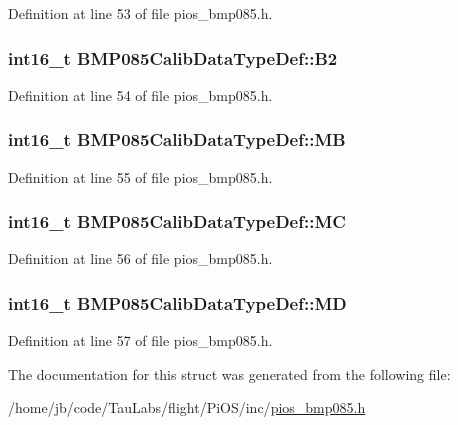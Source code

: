 \-Definition at line 53 of file pios\-\_\-bmp085.\-h.

\hypertarget{struct_b_m_p085_calib_data_type_def_a895d74abbbe7071148feed73f8217a20}{
\subsubsection[{\-B2}]{\setlength{\rightskip}{0pt plus 5cm}int16\-\_\-t {\bf \-B\-M\-P085\-Calib\-Data\-Type\-Def\-::\-B2}}}\label{struct_b_m_p085_calib_data_type_def_a895d74abbbe7071148feed73f8217a20}


\-Definition at line 54 of file pios\-\_\-bmp085.\-h.

\hypertarget{struct_b_m_p085_calib_data_type_def_a3e2e7b4e98edcfceeb7af2c622db30e9}{
\subsubsection[{\-M\-B}]{\setlength{\rightskip}{0pt plus 5cm}int16\-\_\-t {\bf \-B\-M\-P085\-Calib\-Data\-Type\-Def\-::\-M\-B}}}\label{struct_b_m_p085_calib_data_type_def_a3e2e7b4e98edcfceeb7af2c622db30e9}


\-Definition at line 55 of file pios\-\_\-bmp085.\-h.

\hypertarget{struct_b_m_p085_calib_data_type_def_a1665d1134225ff27705293714f8301f6}{
\subsubsection[{\-M\-C}]{\setlength{\rightskip}{0pt plus 5cm}int16\-\_\-t {\bf \-B\-M\-P085\-Calib\-Data\-Type\-Def\-::\-M\-C}}}\label{struct_b_m_p085_calib_data_type_def_a1665d1134225ff27705293714f8301f6}


\-Definition at line 56 of file pios\-\_\-bmp085.\-h.

\hypertarget{struct_b_m_p085_calib_data_type_def_a8bc67ebe1ea785684147c375ccc9b1be}{
\subsubsection[{\-M\-D}]{\setlength{\rightskip}{0pt plus 5cm}int16\-\_\-t {\bf \-B\-M\-P085\-Calib\-Data\-Type\-Def\-::\-M\-D}}}\label{struct_b_m_p085_calib_data_type_def_a8bc67ebe1ea785684147c375ccc9b1be}


\-Definition at line 57 of file pios\-\_\-bmp085.\-h.



\-The documentation for this struct was generated from the following file\-:\begin{DoxyCompactItemize}
\item 
/home/jb/code/\-Tau\-Labs/flight/\-Pi\-O\-S/inc/\hyperlink{pios__bmp085_8h}{pios\-\_\-bmp085.\-h}\end{DoxyCompactItemize}
